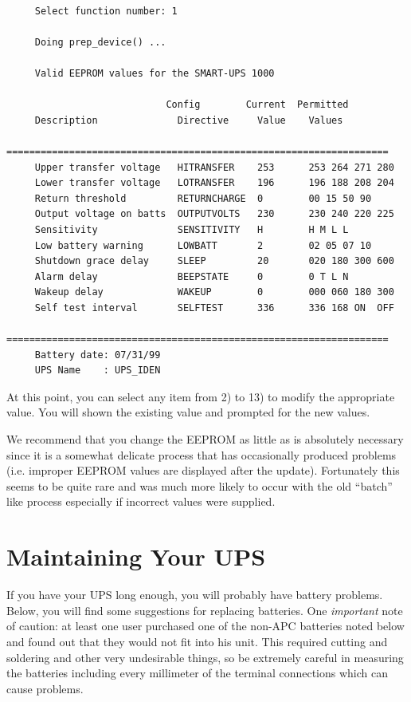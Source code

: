 {{{{{{{{{\footnotesize
\begin{verbatim}
     
     Select function number: 1
     
     Doing prep_device() ...
     
     Valid EEPROM values for the SMART-UPS 1000
     
                            Config        Current  Permitted
     Description              Directive     Value    Values
     ===================================================================
     Upper transfer voltage   HITRANSFER    253      253 264 271 280
     Lower transfer voltage   LOTRANSFER    196      196 188 208 204
     Return threshold         RETURNCHARGE  0        00 15 50 90
     Output voltage on batts  OUTPUTVOLTS   230      230 240 220 225
     Sensitivity              SENSITIVITY   H        H M L L
     Low battery warning      LOWBATT       2        02 05 07 10
     Shutdown grace delay     SLEEP         20       020 180 300 600
     Alarm delay              BEEPSTATE     0        0 T L N
     Wakeup delay             WAKEUP        0        000 060 180 300
     Self test interval       SELFTEST      336      336 168 ON  OFF
     ===================================================================
     Battery date: 07/31/99
     UPS Name    : UPS_IDEN
\end{verbatim}
\normalsize

At this point, you can select any item from 2) to 13) to modify the
appropriate value. You will shown the existing value and prompted for the new
values.  

We recommend that you change the EEPROM as little as is absolutely necessary
since it is a somewhat delicate process that has occasionally produced
problems (i.e. improper EEPROM values are displayed after the update).
Fortunately this seems to be quite rare and was much more likely to occur with
the old ``batch'' like process especially if incorrect values were supplied. 

\label{Maintaining-Your-UPS}

\section*{Maintaining Your UPS}

\label{index-Maintenance-144}
If you have your UPS long enough, you will probably have battery problems.
Below, you will find some suggestions for replacing batteries. One {\it
important} note of caution: at least one user purchased one of the non-APC
batteries noted below and found out that they would not fit into his unit.
This required cutting and soldering and other very undesirable things, so be
extremely careful in measuring the batteries including every millimeter of the
terminal connections which can cause problems.  

}}}}}}}}}
